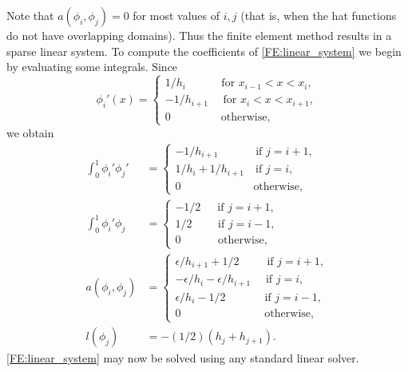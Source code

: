 Note that $a(\phi_i,\phi_j) = 0$ for most values of $i, j$ (that is, when the hat functions do not have overlapping domains).  Thus the finite element method results in a sparse linear system. 
To compute the coefficients of \eqref{FE:linear_system} we begin by evaluating some integrals. Since
\[
\phi_i'(x) = \begin{cases}
1/h_i \quad \quad \quad \, \text{for } x_{i-1} < x < x_i,\\
 -1/h_{i+1} \quad \text{ for } x_{i} < x < x_{i+1},\\
0 \quad \quad \quad \quad \, \text{ otherwise},
\end{cases}
\]
we obtain  
\begin{align*}
\int_0^1  \phi_i'\phi_j' &= \begin{cases}
- 1/h_{i+1} \quad \quad \quad \text{ if } j=i+1,\\
1/h_i + 1/h_{i+1} \quad \text{if } j=i,\\
0 \quad \quad \quad \quad \quad \quad \, \text{ otherwise},
\end{cases} \\
\int_0^1  \phi_i'\phi_j &= \begin{cases}
- 1/2 \quad \,\text{ if } j=i+1,\\
1/2 \quad \quad \text{ if } j=i-1,\\
0 \quad \quad \quad \text{ otherwise},
\end{cases} \\
a(\phi_i,\phi_j) &= \begin{cases}
\epsilon/h_{i+1} + 1/2 \quad \quad \, \text{ if } j=i+1,\\
-\epsilon/h_i -\epsilon/h_{i+1} \quad  \text{ if } j=i,\\
\epsilon/h_i - 1/2 \quad \quad \quad \, \text{ if } j=i-1,\\
0 \quad \quad \quad \quad \quad \quad \,\,\,\,\,\,\, \text{ otherwise},
\end{cases}\\
l(\phi_j) &= -(1/2)(h_j + h_{j+1}).
\end{align*}
 \eqref{FE:linear_system} may now be solved using any standard linear solver. 

